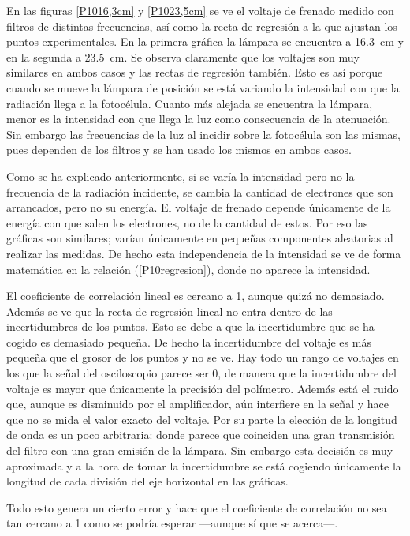 \documentclass[12pt]{article}
\numberwithin{table}{section}
\numberwithin{figure}{section}
\numberwithin{equation}{section}
\begin{document}
En las figuras \ref{P1016,3cm} y \ref{P1023,5cm} se ve el voltaje de frenado medido con filtros de distintas frecuencias, así como la recta de regresión a la que ajustan los puntos experimentales. En la primera gráfica la lámpara se encuentra a \SI{16.3}{cm} y en la segunda a \SI{23.5}{cm}. Se observa claramente que los voltajes son muy similares en ambos casos y las rectas de regresión también. Esto es así porque cuando se mueve la lámpara de posición se está variando la intensidad con que la radiación llega a la fotocélula. Cuanto más alejada se encuentra la lámpara, menor es la intensidad con que llega la luz como consecuencia de la atenuación. Sin embargo las frecuencias de la luz al incidir sobre la fotocélula son las mismas, pues dependen de los filtros y se han usado los mismos en ambos casos.

Como se ha explicado anteriormente, si se varía la intensidad pero no la frecuencia de la radiación incidente, se cambia la cantidad de electrones que son arrancados, pero no su energía. El voltaje de frenado depende únicamente de la energía con que salen los electrones, no de la cantidad de estos. Por eso las gráficas son similares; varían únicamente en pequeñas componentes aleatorias al realizar las medidas. De hecho esta independencia de la intensidad se ve de forma matemática en la relación (\ref{P10regresion}), donde no aparece la intensidad.

El coeficiente de correlación lineal es cercano a 1, aunque quizá no demasiado. Además se ve que la recta de regresión lineal no entra dentro de las incertidumbres de los puntos. Esto se debe a que la incertidumbre que se ha cogido es demasiado pequeña. De hecho la incertidumbre del voltaje es más pequeña que el grosor de los puntos y no se ve. Hay todo un rango de voltajes en los que la señal del osciloscopio parece ser 0, de manera que la incertidumbre del voltaje es mayor que únicamente la precisión del polímetro. Además está el ruido que, aunque es disminuido por el amplificador, aún interfiere en la señal y hace que no se mida el valor exacto del voltaje. Por su parte la elección de la longitud de onda es un poco arbitraria: donde parece que coinciden una gran transmisión del filtro con una gran emisión de la lámpara. Sin embargo esta decisión es muy aproximada y a la hora de tomar la incertidumbre se está cogiendo únicamente la longitud de cada división del eje horizontal en las gráficas.

Todo esto genera un cierto error y hace que el coeficiente de correlación no sea tan cercano a 1 como se podría esperar ---aunque sí que se acerca---.
\end{document}
